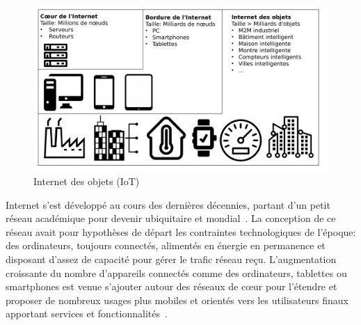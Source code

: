 






\begin{figure}[ht]
	\centering
	\includegraphics[width=.8\linewidth]{img/iot_vision.pdf}
	\caption{Internet des objets (IoT)}
	\label{intro:iot_vision}
\end{figure}

Internet s'est développé au cours des dernières décennies, partant d'un petit réseau académique pour devenir ubiquitaire et mondial~\cite{pujolle2014reseaux}.
La conception de ce réseau avait pour hypothèses de départ les contraintes technologiques de l'époque: des ordinateurs, toujours connectés, alimentés en énergie en permanence et disposant d'assez de capacité pour gérer le trafic réseau reçu.
L'augmentation croissante du nombre d'appareils connectés comme des ordinateurs, tablettes ou smartphones est venue s'ajouter autour des réseaux de cœur pour l'étendre et proposer de nombreux usages plus mobiles et orientés vers les utilisateurs finaux apportant services et fonctionnalités~\cite{falaki2010diversity}.

